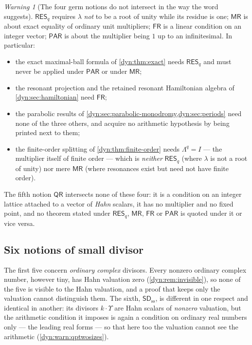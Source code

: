 \documentclass[11pt,letterpaper]{article}
\theoremstyle{definition}
\theoremstyle{remark}
\newtheorem{warning}[warning]{Warning}
\newcommand{\resq}{\mathsf{RES}_q}
\newcommand{\mres}{\mathsf{MR}}
\newcommand{\fres}{\mathsf{FR}}
\newcommand{\pares}{\mathsf{PAR}}
\newcommand{\qres}{\mathsf{QR}}
\newcommand{\sdss}{\mathsf{SD}_{\mathrm{ss}}}
\numberwithin{equation}{section}
\begin{document}
\begin{warning}[The four germ notions do not intersect in the way the word
suggests]
\label{dyn:warn:resonance}
$\resq$ requires $\lambda$ \emph{not} to be a root of unity while its
residue is one; $\mres$ is about exact equality of ordinary unit
multipliers; $\fres$ is a linear condition on an integer vector; $\pares$
is about the multiplier being $1$ up to an infinitesimal. In particular:
\begin{itemize}
\item the exact maximal-ball formula of \cref{dyn:thm:exact} needs
$\resq$ and must never be applied under $\pares$ or under $\mres$;
\item the resonant projection and the retained resonant Hamiltonian
algebra of \cref{dyn:sec:hamiltonian} need $\fres$;
\item the parabolic results of \cref{dyn:sec:parabolic-monodromy,dyn:sec:periods}
need none of the three others, and acquire no arithmetic hypothesis by
being printed next to them;
\item the finite-order splitting of \cref{dyn:thm:finite-order} needs
$\Lambda^{q}=I$ --- the multiplier itself of finite order --- which is
\emph{neither} $\resq$ (where $\lambda$ is not a root of unity) nor mere
$\mres$ (where resonances exist but need not have finite order).
\end{itemize}
The fifth notion $\qres$ intersects none of these four: it is a condition
on an integer lattice attached to a vector of \emph{Hahn} scalars, it has
no multiplier and no fixed point, and no theorem stated under $\resq$,
$\mres$, $\fres$ or $\pares$ is quoted under it or vice versa.
\end{warning}

\subsection{Six notions of small divisor}
\label{dyn:subsec:smalldivisor}

The first five concern \emph{ordinary complex} divisors. Every nonzero ordinary
complex number, however tiny, has Hahn valuation zero
(\cref{dyn:rem:invisible}), so none of the five is visible to the Hahn
valuation, and a proof that keeps only the valuation cannot distinguish
them. The sixth, $\sdss$, is different in one respect and identical in
another: its divisors $k\cdot\Upsilon$ are Hahn scalars of \emph{nonzero}
valuation, but the arithmetic condition it imposes is again a condition on
ordinary real numbers only --- the leading real forms --- so that here too
the valuation cannot see the arithmetic
(\cref{dyn:warn:qptwosizes}).
\end{document}
